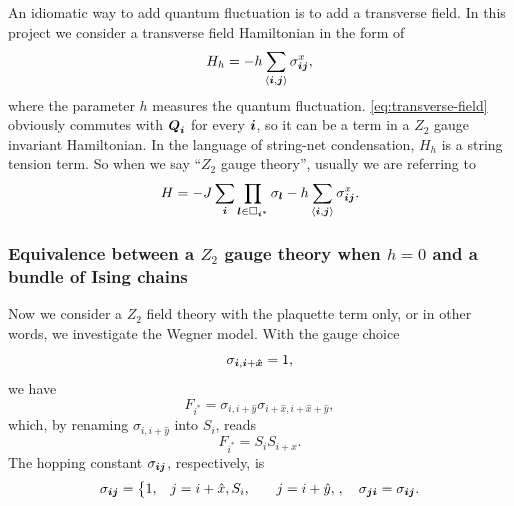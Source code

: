 \documentclass[hyperref, a4paper]{article}
\newcommand*{\pair}[1]{\langle #1 \rangle}
\newcommand*{\Ztwo}{$\mathbb{Z}_2$ }
\def\\{}%
\def\mathbb#1{#1}%
\begin{document}
An idiomatic way to add quantum fluctuation is to add a transverse field.
In this project we consider a transverse field Hamiltonian in the form of 
\begin{equation}
    H_h = - h \sum_{\pair{\vb*{i}, \vb*{j}}} \sigma_{\vb*{i} \vb*{j}}^x ,
    \label{eq:transverse-field}
\end{equation}
where the parameter $h$ measures the quantum fluctuation.
\eqref{eq:transverse-field} obviously commutes with $\vb*{Q}_{\vb*{i}}$ for every $\vb*{i}$, so it can be a term in a \Ztwo gauge invariant Hamiltonian. 
In the language of string-net condensation, $H_h$ is a string tension term.
So when we say ``\Ztwo gauge theory'', usually we are referring to 
\begin{equation}
    H = - J \sum_{\vb*{i}} \prod_{\vb*{l} \in \Box_{\vb*{i}^*}} \sigma_{\vb*{l}} - h \sum_{\pair{\vb*{i}, \vb*{j}}} \sigma_{\vb*{i} \vb*{j}}^x.
    \label{eq:standard-z2-theory}
\end{equation}

\subsubsection{Equivalence between a \Ztwo gauge theory when $h = 0$ and a bundle of Ising chains}

Now we consider a \Ztwo field theory with the plaquette term only, or in other words, we investigate the Wegner model.
With the gauge choice
\begin{equation}
    \sigma_{\vb*{i}, \vb*{i}+\vu*{x}} = 1,
    \label{eq:gauge-choice-x}
\end{equation}
we have
\begin{equation}
    F_{i^*} = \sigma_{i, i+\hat{y}} \sigma_{i+\hat{x}, i + \hat{x} + \hat{y}},
\end{equation}
which, by renaming $\sigma_{i, i+\hat{y}}$ into $S_i$, reads 
\begin{equation}
    F_{i^*} = S_i S_{i+\hat{x}}.
\end{equation}
The hopping constant $\sigma_{\vb*{i} \vb*{j}}$, respectively, is
\begin{equation}
    \sigma_{\vb*{i} \vb*{j}} = \left\{
    \begin{aligned}
        1, &\quad j = i + \hat{x}, \\
        S_i, &\quad j = i + \hat{y},
    \end{aligned}
\right., \quad \sigma_{\vb*{j} \vb*{i}} = \sigma_{\vb*{i} \vb*{j}}.
\end{equation}
\end{document}
